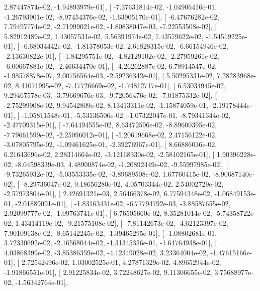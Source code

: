 \documentclass{article}
\begin{document}
          2.87447874e-02,  -1.94893979e-01],
       [ -7.37631814e-02,  -1.04906416e-01,  -1.26793901e-02,
         -8.97454376e-02,  -1.63905170e-01],
       [ -6.47676282e-02,   7.79497774e-02,  -2.71999021e-02,
         -1.80838047e-03,  -7.22553508e-02],
       [  5.82912489e-02,   1.43057531e-02,   5.56391974e-02,
          7.43579622e-02,  -1.54519225e-01],
       [ -6.68034442e-02,  -1.81378053e-02,   2.61828315e-02,
         -6.66154946e-02,  -2.13630822e-01],
       [ -1.84295751e-02,  -4.82129102e-02,  -2.27959261e-02,
         -6.00667881e-02,  -2.46634470e-01],
       [ -4.26262887e-02,   6.78914547e-02,  -1.98578878e-07,
          2.00756564e-03,  -2.59236342e-01],
       [  5.50295331e-02,   7.28283968e-02,   8.41071995e-02,
         -7.17726669e-02,  -1.74812717e-01],
       [  6.53034945e-02,   9.29467578e-03,  -3.79669676e-03,
         -9.72056476e-02,  -7.01875332e-02],
       [ -2.75299908e-02,   9.94542809e-02,   8.13413311e-02,
         -1.15874059e-01,  -2.19178444e-01],
       [ -1.05811548e-01,  -5.53136506e-02,  -1.07322047e-01,
         -8.79341344e-02,  -2.47709315e-01],
       [ -7.64494555e-02,   8.63472596e-02,  -8.89600395e-02,
         -7.79661599e-02,  -2.25096012e-01],
       [ -5.20619668e-02,   2.47156122e-02,  -3.07805795e-02,
         -1.09461625e-01,  -2.39276967e-01],
       [  8.66886036e-02,   6.21643696e-02,   2.28314664e-02,
         -3.12168330e-02,  -2.58102165e-01],
       [  1.90396228e-02,  -8.04598339e-03,   4.48900874e-02,
         -1.20892449e-02,  -9.55997985e-02],
       [ -9.73265932e-02,  -5.03553335e-02,  -3.89689508e-02,
          1.67760415e-02,  -8.90687140e-02],
       [ -8.29736047e-02,   9.18656280e-02,   4.05703344e-02,
          2.54002729e-02,  -2.57973804e-01],
       [  2.42691321e-03,   2.56466378e-02,   6.77594348e-02,
         -1.06849153e-01,  -2.01889091e-01],
       [ -1.83163431e-02,  -6.77794792e-03,  -3.88587655e-02,
          2.92099777e-02,  -1.09763741e-01],
       [  6.76505660e-02,   8.35281014e-02,  -5.74358722e-02,
          1.43414119e-02,  -9.21575108e-02],
       [ -7.81142673e-02,  -4.62123397e-02,   7.90109138e-02,
         -8.65142245e-02,  -1.39465295e-01],
       [ -1.08802681e-01,   3.72330692e-02,  -2.16568044e-02,
         -1.31345356e-01,  -1.64764938e-01],
       [  4.03868399e-02,  -3.85386359e-02,  -4.12349028e-02,
          3.23364004e-02,  -1.47615166e-01],
       [  2.72542496e-02,   1.03002525e-01,   4.27871329e-02,
          4.89652944e-02,  -1.91866551e-01],
       [  2.91225834e-02,   3.72248627e-02,   9.11306655e-02,
          3.75688977e-02,  -1.56342764e-01],
\end{document}
